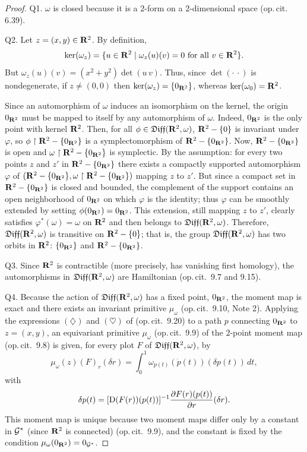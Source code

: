 \begin{proof}
  Q1. $\omega$ is closed because it is a $2$-form on a $2$-dimensional space (op.\,cit. \textsection\,6.39).
  
  Q2. Let $z = (x,y) \in \mathbf{R}^2$.
  By definition,
  $$
    \mathrm{ker}(\omega_z) = \{u \in \mathbf{R}^2 \mid \omega_z(u)(v) = 0 \mbox{ for all } v \in \mathbf{R}^2 \}.
    $$
  But $\omega_z(u)(v) = (x^2 + y^2) \det(u\, v)$.
  Thus,
   since $\det( \cdot\, \cdot )$ is nondegenerate,
  if $z \neq (0,0)$ then $\mathrm{ker}(\omega_z) = \{0_{\mathbf{R}^2}\}$,
  whereas $\mathrm{ker}(\omega_0) = \mathbf{R}^2$.
  
  Since an automorphism of $\omega$ induces an isomorphism on the kernel,
  the origin $0_{\mathbf{R}^2}$ must be mapped to itself by any automorphism of $\omega$.
  Indeed,
  $0_{\mathbf{R}^2}$ is the only point with kernel $\mathbf{R}^2$.
  Then,
  for all $\phi \in \mathfrak{Diff}(\mathbf{R}^2,\omega)$,
  $\mathbf{R}^2-\{0\}$ is invariant under $\varphi$,
  so $\phi \restriction \mathbf{R}^2-\{0_{\mathbf{R}^2}\}$ is a symplectomorphism of $\mathbf{R}^2-\{0_{\mathbf{R}^2}\}$.
  Now,
   $\mathbf{R}^2-\{0_{\mathbf{R}^2}\}$ is open and $\omega \restriction \mathbf{R}^2-\{0_{\mathbf{R}^2}\}$ is symplectic.
   By the assumption:
  for every two points $z$ and $z'$ in $\mathbf{R}^2-\{0_{\mathbf{R}^2}\}$ there exists a compactly supported automorphism $\varphi$ of $(\mathbf{R}^2-\{0_{\mathbf{R}^2}\}, \omega \restriction \mathbf{R}^2-\{0_{\mathbf{R}^2}\})$ mapping $z$ to $z'$.
  But since a compact set in $\mathbf{R}^2-\{0_{\mathbf{R}^2}\}$ is closed and bounded,
  the complement of the support contains an open neighborhood of $0_{\mathbf{R}^2}$ on which $\varphi$ is the identity;
  thus $\varphi$ can be smoothly extended by setting $\phi(0_{\mathbf{R}^2}) = 0_{\mathbf{R}^2}$.
  This extension,
  still mapping $z$ to $z'$,
  clearly satisfies $\varphi^*(\omega) = \omega$ on $\mathbf{R}^2$ and then belongs to $\mathfrak{Diff}(\mathbf{R}^2,\omega)$.
  Therefore,
  $\mathfrak{Diff}(\mathbf{R}^2,\omega)$ is transitive on $\mathbf{R}^2 - \{0\}$;
  that is,
  the group $\mathfrak{Diff}(\mathbf{R}^2,\omega)$ has two orbits in $\mathbf{R}^2$: $\{0_{\mathbf{R}^2}\}$ and $\mathbf{R}^2 - \{0_{\mathbf{R}^2}\}$.
  
  Q3. Since $\mathbf{R}^2$ is contractible (more precisely, has vanishing first homology),
  the automorphisms in $\mathfrak{Diff}(\mathbf{R}^2,\omega)$ are Hamiltonian (op.\,cit. \textsection\,9.7 and 9.15).
  
  Q4. Because the action of $\mathfrak{Diff}(\mathbf{R}^2,\omega)$ has a fixed point,
  $0_{\mathbf{R}^2}$,
  the moment map is exact and there exists an invariant primitive $\mu_\omega$ (op.\,cit. \textsection\,9.10, Note 2).
  Applying the expressions $(\diamondsuit)$ and $(\heartsuit)$ of (op.\,cit. \textsection\,9.20) to a path $p$ connecting $0_{\mathbf{R}^2}$ to $z=(x,y)$,
  an equivariant primitive $\mu_\omega$ (op.\,cit. \textsection\,9.9) of the $2$-point moment map (op.\,cit. \textsection\,9.8) is given,
   for every plot $F$ of $\mathfrak{Diff}(\mathbf{R}^2,\omega)$,
   by
  $$
    \mu_\omega(z)(F)_r(\delta r) = \int_0^1\omega_{p(t)}(\dot p(t))(\delta p(t))\, dt, 
    $$
  with
  $$
    \delta p(t) = [\operatorname{D}(F(r))(p(t))]^{-1} {\partial F(r)(p(t)) \over \partial r} (\delta r).
    $$
  This moment map is unique because two moment maps differ only by a constant in $\mathcal{G}^*$
  (since $\mathbf{R}^2$ is connected) (op.\,cit. \textsection\,9.9),
  and the constant is fixed by the condition $\mu_\omega(0_{\mathbf{R}^2}) = 0_{\mathcal{G}^*}$.
  

\end{proof}
